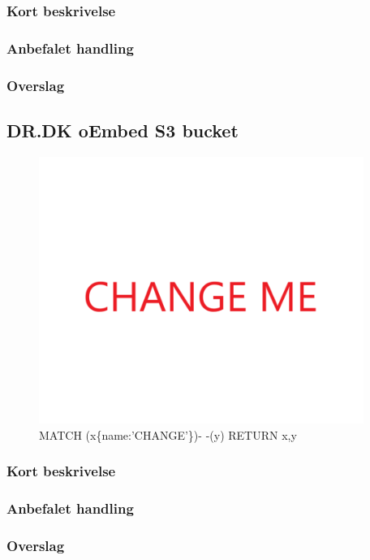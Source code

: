 \documentclass{article}
\begin{document}
\subsubsection{Kort beskrivelse}
\subsubsection{Anbefalet handling}
\subsubsection{Overslag}


\subsection{DR.DK oEmbed S3 bucket}
\begin{figure}[h]
\includegraphics[width=300pt]{CHANGE.PNG}
\caption{MATCH (x\{name:'CHANGE'\})- -(y) RETURN x,y}
\end{figure}
\subsubsection{Kort beskrivelse}
\subsubsection{Anbefalet handling}
\subsubsection{Overslag}
\end{document}
